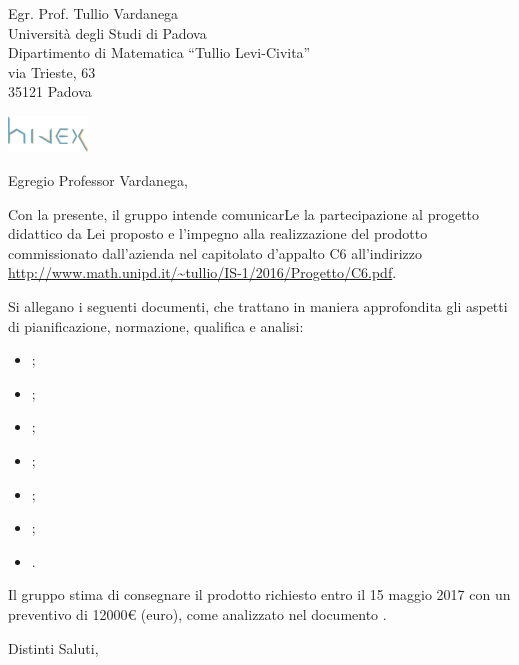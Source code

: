 \documentclass[a4paper]{letter} %
\date{Padova, \today}
\begin{document}
\begin{letter}{Egr. Prof. Tullio Vardanega\\
Università degli Studi di Padova\\
Dipartimento di Matematica “Tullio Levi-Civita”\\
via Trieste, 63\\
35121 Padova}

\includegraphics[width=80px]{../../util/hivex_logo3.png}

\opening{Egregio Professor Vardanega,}

Con la presente, il gruppo \hx{} intende comunicarLe la partecipazione al progetto didattico da Lei proposto e l'impegno alla realizzazione del prodotto \proj{} commissionato dall'azienda \ZU{} nel capitolato d'appalto C6 all'indirizzo \url{http://www.math.unipd.it/~tullio/IS-1/2016/Progetto/C6.pdf}.

Si allegano i seguenti documenti, che trattano in maniera approfondita gli aspetti di pianificazione, normazione, qualifica e analisi:
\begin{itemize}
	\item \SdF;
	\item \NdP;
	\item \PdP;
	\item \PdQ;
	\item \AdR;
	\item \Glossario;
	\item \Verbali.
\end{itemize}



Il gruppo \hx{} stima di consegnare il prodotto richiesto entro il 15 maggio 2017 con un preventivo di \num{12000}\euro{} (euro), come analizzato nel documento \PdP.

\closing{Distinti Saluti,}

\end{letter}
\end{document}
